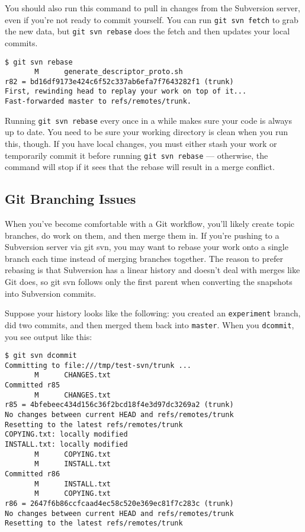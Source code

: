 \documentclass[a4paper]{book}
\newcounter{tab}[chapter]
\begin{document}
You should also run this command to pull in changes from the Subversion server, even if you're not ready to commit yourself. You can run \texttt{git svn fetch} to grab the new data, but \texttt{git svn rebase} does the fetch and then updates your local commits.

\begin{shaded}\begin{verbatim}
$ git svn rebase
       M      generate_descriptor_proto.sh
r82 = bd16df9173e424c6f52c337ab6efa7f7643282f1 (trunk)
First, rewinding head to replay your work on top of it...
Fast-forwarded master to refs/remotes/trunk.
\end{verbatim}\end{shaded}

Running \texttt{git svn rebase} every once in a while makes sure your code is always up to date. You need to be sure your working directory is clean when you run this, though. If you have local changes, you must either stash your work or temporarily commit it before running \texttt{git svn rebase} --- otherwise, the command will stop if it sees that the rebase will result in a merge conflict.

\subsection{Git Branching Issues}\label{git-branching-issues}

When you've become comfortable with a Git workflow, you'll likely create topic branches, do work on them, and then merge them in. If you're pushing to a Subversion server via git svn, you may want to rebase your work onto a single branch each time instead of merging branches together. The reason to prefer rebasing is that Subversion has a linear history and doesn't deal with merges like Git does, so git svn follows only the first parent when converting the snapshots into Subversion commits.

Suppose your history looks like the following: you created an \texttt{experiment} branch, did two commits, and then merged them back into \texttt{master}. When you \texttt{dcommit}, you see output like this:

\begin{shaded}\begin{verbatim}
$ git svn dcommit
Committing to file:///tmp/test-svn/trunk ...
       M      CHANGES.txt
Committed r85
       M      CHANGES.txt
r85 = 4bfebeec434d156c36f2bcd18f4e3d97dc3269a2 (trunk)
No changes between current HEAD and refs/remotes/trunk
Resetting to the latest refs/remotes/trunk
COPYING.txt: locally modified
INSTALL.txt: locally modified
       M      COPYING.txt
       M      INSTALL.txt
Committed r86
       M      INSTALL.txt
       M      COPYING.txt
r86 = 2647f6b86ccfcaad4ec58c520e369ec81f7c283c (trunk)
No changes between current HEAD and refs/remotes/trunk
Resetting to the latest refs/remotes/trunk
\end{verbatim}\end{shaded}
\end{document}
